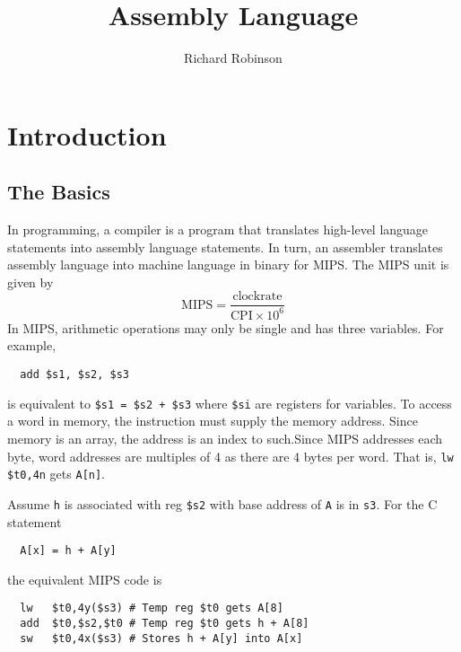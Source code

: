 \documentclass{tufte-book}
\title{Assembly Language}
\author{Richard Robinson}
\begin{document}
\frontmatter
\maketitle
\tableofcontents
\mainmatter

\setlength{\parindent}{0pt}


\chapter{Introduction}

\section{The Basics}

In programming, a compiler is a program that translates high-level language statements into assembly language statements. In turn, an assembler translates assembly language into machine language in binary for MIPS. The MIPS unit is given by
\begin{equation}
  \mathrm{MIPS} = \frac{\mathrm{clock rate}}{\mathrm{CPI} \times 10^6}
\end{equation}
In MIPS, arithmetic operations may only be single and has three variables. For example,
\begin{verbatim}
  add $s1, $s2, $s3
\end{verbatim}
is equivalent to \verb|$s1 = $s2 + $s3| where \verb|$si| are registers for variables. To access a word in memory, the instruction must supply the memory address. Since memory is an array, the address is an index to such.Since MIPS addresses each byte, word addresses are multiples of 4 as there are 4 bytes per word. That is, \verb|lw $t0,4n| gets \verb|A[n]|.

\bigskip
Assume \verb|h| is associated with reg \verb|$s2| with base address of \verb|A| is in \verb|s3|. For the C statement
\begin{verbatim}
  A[x] = h + A[y]
\end{verbatim}
the equivalent MIPS code is
\begin{lstlisting}
  lw   $t0,4y($s3) # Temp reg $t0 gets A[8]
  add  $t0,$s2,$t0 # Temp reg $t0 gets h + A[8]
  sw   $t0,4x($s3) # Stores h + A[y] into A[x]
\end{lstlisting}
\end{document}
